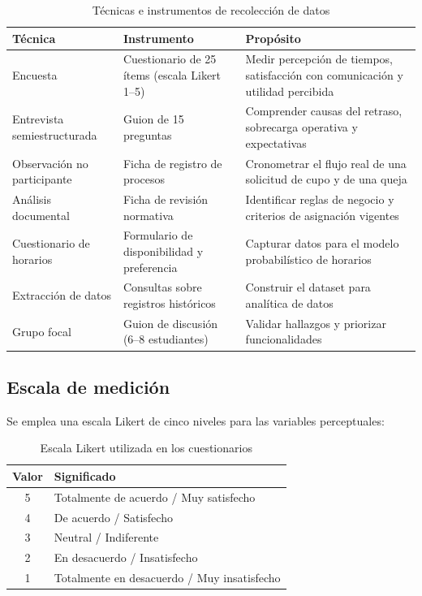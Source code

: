 \begin{table}[H]
\centering
\caption{Técnicas e instrumentos de recolección de datos}
\label{tab:instrumentos}
\small
\begin{tabularx}{\textwidth}{@{}p{3.4cm} p{4.9cm} X@{}}
\toprule
\rowcolor{naranjaClaro}
\textbf{Técnica} & \textbf{Instrumento} & \textbf{Propósito} \\
\midrule
Encuesta & Cuestionario de 25 ítems (escala Likert 1--5) &
    Medir percepción de tiempos, satisfacción con comunicación y utilidad percibida \\
Entrevista semiestructurada & Guion de 15 preguntas &
    Comprender causas del retraso, sobrecarga operativa y expectativas \\
Observación no participante & Ficha de registro de procesos &
    Cronometrar el flujo real de una solicitud de cupo y de una queja \\
Análisis documental & Ficha de revisión normativa &
    Identificar reglas de negocio y criterios de asignación vigentes \\
Cuestionario de horarios & Formulario de disponibilidad y preferencia &
    Capturar datos para el modelo probabilístico de horarios \\
Extracción de datos & Consultas sobre registros históricos &
    Construir el dataset para analítica de datos \\
Grupo focal & Guion de discusión (6--8 estudiantes) &
    Validar hallazgos y priorizar funcionalidades \\
\bottomrule
\end{tabularx}
\end{table}

\subsection{Escala de medición}
Se emplea una escala Likert de cinco niveles para las variables perceptuales:

\begin{table}[H]
\centering
\caption{Escala Likert utilizada en los cuestionarios}
\label{tab:likert}
\begin{tabular}{@{}c l@{}}
\toprule
\rowcolor{moradoClaro}
\textbf{Valor} & \textbf{Significado} \\
\midrule
5 & Totalmente de acuerdo / Muy satisfecho \\
4 & De acuerdo / Satisfecho \\
3 & Neutral / Indiferente \\
2 & En desacuerdo / Insatisfecho \\
1 & Totalmente en desacuerdo / Muy insatisfecho \\
\bottomrule
\end{tabular}
\end{table}

